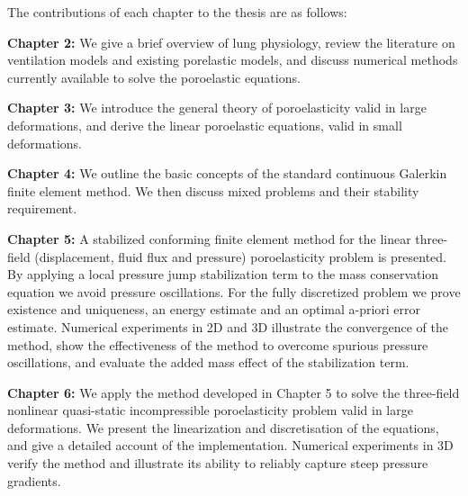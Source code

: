 The contributions of each chapter to the thesis are as follows:\newline

\noindent \textbf{Chapter 2:} We give a brief overview of lung physiology, review the literature on ventilation models and existing porelastic models, and discuss numerical methods currently available to solve the poroelastic equations.\newline

\noindent \textbf{Chapter 3:} We introduce the general theory of poroelasticity valid in large deformations, and derive the linear poroelastic equations, valid in small deformations.\newline

\noindent \textbf{Chapter 4:} We
outline the basic concepts of the standard
continuous Galerkin finite element method. We then discuss mixed problems and their stability requirement.
\newline

\noindent \textbf{Chapter 5:} A stabilized conforming finite element method for the linear three-field (displacement, fluid flux and pressure) poroelasticity problem is presented. By applying a local pressure jump stabilization term to the mass conservation equation we avoid pressure oscillations. For the fully discretized problem we prove existence and uniqueness, an energy estimate and an optimal a-priori error estimate. Numerical experiments in 2D and 3D illustrate the convergence of the method, show the effectiveness of the method to overcome spurious pressure oscillations, and evaluate the added mass effect of the stabilization term.
\newline
%

\noindent \textbf{Chapter 6:} We apply the method developed in Chapter 5 to solve the three-field nonlinear quasi-static incompressible poroelasticity problem valid in large deformations. We present the linearization and discretisation of the equations, and give a detailed account of the implementation. Numerical experiments in 3D verify the method and illustrate its ability to reliably capture steep pressure gradients.
\newline

